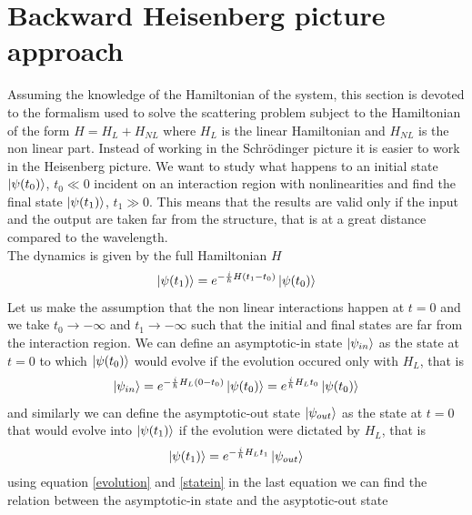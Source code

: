 \documentclass[12pt]{book}
\begin{document}
\section{Backward Heisenberg picture approach}\label{heinsemberg}
Assuming the knowledge of the Hamiltonian of the system, this section is devoted to the formalism used to solve the scattering problem subject to the Hamiltonian of the form $H = H_L +H_{NL}$ where $H_L$ is the linear Hamiltonian and $H_{NL}$ is the non linear part. Instead of working in the Schr{\"o}dinger picture it is easier to work in the Heisenberg picture. 
We want to study what happens to an initial state $\ket{\psi(t_0)}$, $t_0\ll 0$ incident on an interaction region with nonlinearities and find the final state $\ket{\psi(t_1)}$, $t_1\gg 0$. This means that the results are valid only if the input and the output are taken far from the structure, that is at a great distance  compared to the wavelength.\\
The dynamics is given by the full Hamiltonian $H$
\begin{equation}\label{evolution}\ket{\psi(t_1)} = e^{-\frac{i}{\hbar}H (t_1-t_0)}\ket{\psi(t_0)}\end{equation}
Let us make the assumption that the non linear interactions happen at $t=0$ and we take $t_0 \to -\infty$ and $t_1 \to -\infty$ such that the initial and final states are far from the interaction region. We can define an asymptotic-in state $\ket{\psi_{in}}$ as the state at $t=0$ to which $\ket{\psi(t_0)}$ would evolve if the evolution occured only with $H_L$, that is
\begin{equation}\label{statein}\ket{\psi_{in}} = e^{-\frac{i}{\hbar}H_L (0-t_0)}\ket{\psi(t_0)} = e^{\frac{i}{\hbar}H_Lt_0}\ket{\psi(t_0)}\end{equation}
and similarly we can define the asymptotic-out state $\ket{\psi_{out}}$ as the state at $t=0$ that would evolve into $\ket{\psi(t_1)}$ if the evolution were dictated by $H_L$, that is
\begin{equation}\ket{\psi(t_1)} = e^{-\frac{i}{\hbar}H_L t_1}\ket{\psi_{out}}\end{equation}
using equation \eqref{evolution} and \eqref{statein} in the last equation we can find the relation between the asymptotic-in state and the asyptotic-out state
\end{document}
